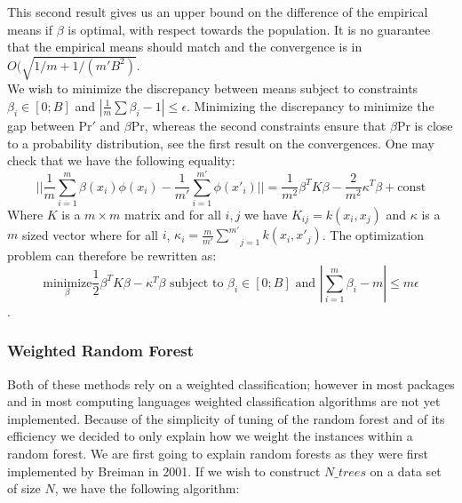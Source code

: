 \documentclass{article}
\newcommand{\PR}{\text{Pr}}
\begin{document}
This second result gives us an upper bound on the difference of the empirical means if $\beta$ is optimal, with respect towards the population. It is no guarantee that the empirical means should match and the convergence is in $O(\sqrt{1/m+1/(m'B^2)}$. \\
We wish to minimize the discrepancy between means subject to constraints $\beta_i \in [0;B]$ and $|\frac{1}{m}\sum \beta_i-1|\leq \epsilon$. Minimizing the discrepancy to minimize the gap between $\PR'$ and $\beta \PR$, whereas the second constraints ensure that $\beta \PR$ is close to a probability distribution, see the first result on the convergences. One may check that we have the following equality:
$$||\frac{1}{m}\underset{i=1}{\overset{m}{\sum}}\beta(x_i)\phi(x_i) - \frac{1}{m'}\underset{i=1}{\overset{m'}{\sum}}\phi(x'_i)|| = \frac{1}{m^2}\beta^T K \beta - \frac{2}{m^2} \kappa^T\beta + \text{const} $$ 
Where $K$ is a $m \times m$ matrix and for all $i, j$ we have $K_{ij}=k(x_i,x_j)$ and $\kappa$ is a $m$ sized vector where for all $i$, $\kappa_i=\frac{m}{m'}\underset{j=1}{\overset{m'}{\sum}}k(x_i,x'_j)$. 
The optimization problem can therefore be rewritten as: 
$$\underset{\beta}{\text{minimize}} \frac{1}{2}\beta^TK\beta-\kappa^T\beta \text{\ subject \ to } \beta_i \in [0;B] \text{\ and \ } |\underset{i=1}{\overset{m}{\sum}}\beta_i-m | \leq m\epsilon$$.



\subsubsection{Weighted Random Forest}

Both of these methods rely on a weighted classification; however in most packages and in most computing languages weighted classification algorithms are not yet implemented. Because of the simplicity of tuning of the random forest and of its efficiency we decided to only explain how we weight the instances within a random forest. We are first going to explain random forests as they were first implemented by Breiman in 2001. If we wish to construct $N\_trees$ on a data set of size $N$, we have the following algorithm:
\end{document}
